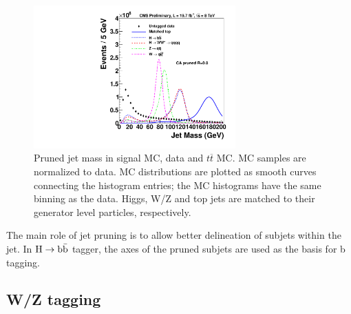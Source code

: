 \begin{figure}[htb]
\begin{center}
\includegraphics[width=0.69\textwidth]{HbbZqqfigs/Signal/signal-data-qcd-jetmass.pdf}
\end{center}
\caption{Pruned jet mass in signal MC, data and $t\overline{t}$ MC. 
  MC samples are normalized to data.  MC
  distributions are plotted as smooth curves connecting the histogram
  entries; the MC histograms have the same binning as the data.
  Higgs, W/Z and top jets are matched to their generator level particles, 
  respectively. }
\label{fig:JetMassTagging}
\end{figure}


The main role of jet pruning is to allow better delineation of subjets
within the jet.  In ${\rm H \to b\bar{b}}$ tagger, the axes of the 
pruned subjets are used as the basis for b tagging.



\subsection{W/Z tagging  } 
\label{sec:wztagging}

